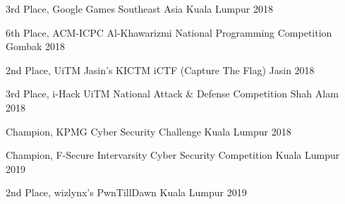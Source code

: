 \begin{cvhonors}
  \cvhonor
    {3rd Place,}
    {Google Games Southeast Asia}
    {Kuala Lumpur}
    {2018}

  \cvhonor
    {6th Place,}
    {ACM-ICPC Al-Khawarizmi National Programming Competition}
    {Gombak}
    {2018}

  \cvhonor
    {2nd Place,}
    {UiTM Jasin's KICTM iCTF (Capture The Flag) }
    {Jasin}
    {2018}

  \cvhonor
    {3rd Place,}
    {i-Hack UiTM National Attack \& Defense Competition}
    {Shah Alam}
    {2018}

  \cvhonor
    {Champion,}
    {KPMG Cyber Security Challenge}
    {Kuala Lumpur}
    {2018}

  \cvhonor
  {Champion,}
  {F-Secure Intervarsity Cyber Security Competition}
  {Kuala Lumpur}
  {2019}

  \cvhonor
  {2nd Place,}
  {wizlynx's PwnTillDawn}
  {Kuala Lumpur}
  {2019}


\end{cvhonors}

\pagebreak


